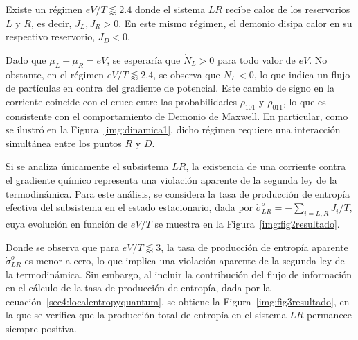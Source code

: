 Existe un régimen \( eV/T \lessapprox 2.4 \) donde el sistema \( LR \) recibe calor de los reservorios \( L \) y \( R \), es decir, \( J_L, J_R > 0 \). En este mismo régimen, el demonio disipa calor en su respectivo reservorio, \( J_D < 0 \). 

Dado que $\mu_L - \mu_R = eV$, se esperaría que $\dot{N}_L > 0$ para todo valor de $eV$. No obstante, en el régimen $eV/T \lessapprox 2.4$, se observa que $\dot{N}_L < 0$, lo que indica un flujo de partículas en contra del gradiente de potencial. Este cambio de signo en la corriente coincide con el cruce entre las probabilidades $\rho_{101}$ y $\rho_{011}$, lo que es consistente con el comportamiento de Demonio de Maxwell. En particular, como se ilustró en la Figura~\ref{img:dinamica1}, dicho régimen requiere una interacción simultánea entre los puntos $R$ y $D$.

Si se analiza únicamente el subsistema $LR$, la existencia de una corriente contra el gradiente químico representa una violación aparente de la segunda ley de la termodinámica. Para este análisis, se considera la tasa de producción de entropía efectiva del subsistema en el estado estacionario, dada por $\dot{\sigma}^{o}_{LR} = - \sum_{i=L,R} J_i/T$, cuya evolución en función de $eV/T$ se muestra en la Figura~\ref{img:fig2resultado}.




Donde se observa que para $eV/T \lessapprox 3$, la tasa de producción de entropía aparente $\dot{\sigma}^{o}_{LR}$ es menor a cero, lo que implica una violación aparente de la segunda ley de la termodinámica. Sin embargo, al incluir la contribución del flujo de información en el cálculo de la tasa de producción de entropía, dada por la ecuación~\eqref{sec4:localentropyquantum}, se obtiene la Figura~\ref{img:fig3resultado}, en la que se verifica que la producción total de entropía en el sistema $LR$ permanece siempre positiva.


